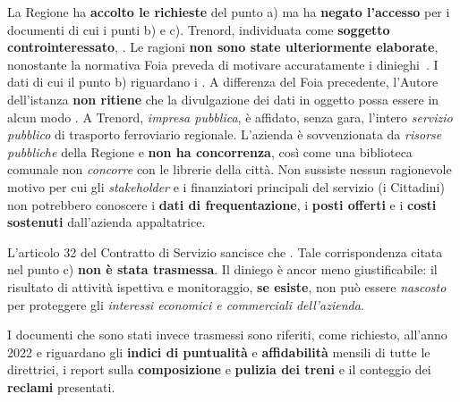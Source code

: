 \documentclass[12pt,a4paper,italian]{report}
\begin{document}
La Regione ha \textbf{accolto le richieste} del punto a) ma ha
\textbf{negato l'accesso} per i documenti di cui i punti b) e c).
Trenord, individuata come \textbf{soggetto controinteressato},
.  Le ragioni \textbf{non sono state ulteriormente
    elaborate}, nonostante la normativa Foia preveda di motivare
accuratamente i dinieghi~\cite[art.\ 5, comma 6]{Dlgs33}.  I dati di
cui il punto b) riguardano i .  A differenza del Foia precedente, l'Autore
dell'istanza \textbf{non ritiene} che la divulgazione dei dati in
oggetto possa essere in alcun modo
.  A Trenord, \textit{impresa
    pubblica}, è affidato, senza gara, l'intero \textit{servizio
    pubblico} di trasporto ferroviario regionale.  L'azienda è
sovvenzionata da \textit{risorse pubbliche} della Regione e
\textbf{non ha concorrenza}, così come una biblioteca comunale non
\textit{concorre} con le librerie della città.  Non sussiste nessun
ragionevole motivo per cui gli \textit{stakeholder} e i finanziatori
principali del servizio (i Cittadini) non potrebbero conoscere i
\textbf{dati di frequentazione}, i \textbf{posti offerti} e i
\textbf{costi sostenuti} dall'azienda appaltatrice.

L'articolo 32 del Contratto di Servizio sancisce che
.  Tale corrispondenza citata nel punto c) \textbf{non
    è stata trasmessa}.  Il diniego è ancor meno giustificabile: il
risultato di attività ispettiva e monitoraggio, \textbf{se esiste},
non può essere \textit{nascosto} per proteggere gli \textit{interessi
    economici e commerciali dell'azienda}.

I documenti che sono stati invece trasmessi sono riferiti, come
richiesto, all'anno 2022 e riguardano gli \textbf{indici di
    puntualità} e \textbf{affidabilità} mensili di tutte le
direttrici, i report sulla \textbf{composizione} e \textbf{pulizia dei
    treni} e il conteggio dei \textbf{reclami} presentati.
\end{document}
